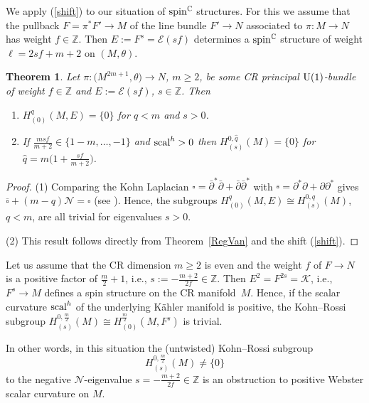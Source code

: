 \documentclass[10pt,a4paper]{amsart}
\numberwithin{equation}{section}
\newtheorem{Theorem}{Theorem}[section]
\newcommand{\ZZ}{\mathbb{Z}}
\newcommand{\CC}{\mathbb{C}}
\begin{document}
We apply (\ref{shift}) to our situation of ${\rm spin}^\CC$ structures.
For this we assume that the pullback $F=\pi^*F'\to M$ of the line bundle $F'\to N$ associated to $\pi\colon M\to N$ has weight $f\in\ZZ$.
Then $E:=F^s=\mathcal{E}(sf)$ determines a ${\rm spin}^\CC$ structure of weight $\ell=2sf+m+2$ on $(M,\theta)$.

\begin{Theorem} Let $\pi\colon \big(M^{2m+1},\theta\big)\to N$, $m\geq 2$, be some CR principal ${\rm U}(1)$-bundle of weight $f\in\ZZ$ and
$E:=\mathcal{E}(sf)$, $s\in\ZZ$. Then
\begin{enumerate}\itemsep=0pt
\item[$1.$] $H^q_{(0)}(M,E)=\{0\}$ for $q<m$ and $s>0$.
\item[$2.$] If $\frac{msf}{m+2}\in\{1-m,\dots,-1\}$ and ${\rm scal}^h>0$ then $H_{(s)}^{0,{\hat{q}}}(M)=\{0\}$ for $\hat{q}=m\big(1+\frac{sf}{m+2}\big)$.
\end{enumerate}
\end{Theorem}

\begin{proof} (1) Comparing the Kohn Laplacian $\square=\bar{\partial}^*\bar{\partial}+\bar{\partial}\bar{\partial}^*$ with
$\overline{\square}= \partial^*\partial+\partial\partial^*$ gives
$ \overline{\square}+ (m-q)\mathcal{N}=\square$
(see \cite{Tan}). Hence, the subgroups $H^q_{(0)}(M,E)\cong H^{0,q}_{(s)}(M)$, $q<m$, are all trivial for eigenvalues $s>0$.

(2) This result follows directly from Theorem~\ref{RegVan} and the shift (\ref{shift}).
\end{proof}

\begin{Example} Let us assume that the CR dimension $m\geq 2$ is even and the weight $f$ of $F\to N$ is a positive factor of $\frac{m}{2}+1$, i.e.,
$s:=-\frac{m+2}{2f}\in\ZZ$. Then $E^2=F^{2s}=\mathcal{K}$, i.e., $F^s\to M$ defines a spin structure
on the CR manifold~$M$. Hence, if the scalar curvature ${\rm scal}^h$ of the underlying K\"ahler manifold is positive,
the Kohn--Rossi subgroup $H_{(s)}^{0,\frac{m}{2}}(M)\cong H_{(0)}^{\frac{m}{2}}(M,F^s)$ is trivial.

In other words, in this situation the (untwisted) Kohn--Rossi subgroup \[ H_{(s)}^{0,\frac{m}{2}}(M) \neq \{0\}\] to the negative $\mathcal{N}$-eigenvalue $s=-\frac{m+2}{2f}\in\ZZ$
is an obstruction to positive Webster scalar curvature on $M$.
\end{Example}
\end{document}
